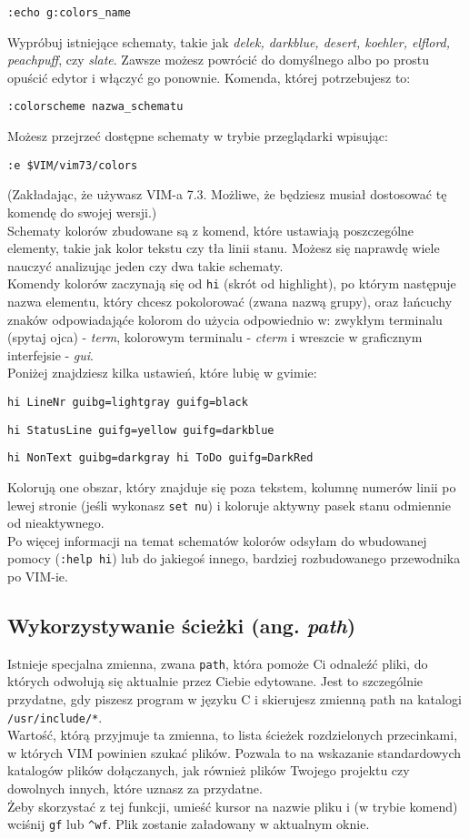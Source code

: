\documentclass[a4paper,12pt]{article}
\begin{document}
{\tt :echo g:colors\_name}

\noindent
Wypróbuj istniejące schematy, takie jak {\it delek, darkblue, desert, koehler, elflord, peachpuff}, czy {\it slate}. Zawsze możesz powrócić do domyślnego albo po prostu opuścić edytor i włączyć go ponownie. Komenda, której potrzebujesz to:

{\tt :colorscheme nazwa\_schematu}

\noindent
Możesz przejrzeć dostępne schematy w trybie przeglądarki wpisując:

{\tt :e \$VIM/vim73/colors}

\noindent
(Zakładając, że używasz VIM-a 7.3. Możliwe, że będziesz musiał dostosować tę komendę do swojej wersji.)\\
Schematy kolorów zbudowane są z komend, które ustawiają poszczególne elementy, takie jak kolor tekstu czy tła linii stanu. Możesz się naprawdę wiele nauczyć analizując jeden czy dwa takie schematy.\\
Komendy kolorów zaczynają się od {\tt hi} (skrót od highlight), po którym następuje nazwa elementu, który chcesz pokolorować (zwana nazwą grupy), oraz łańcuchy znaków odpowiadająće kolorom do użycia odpowiednio w: zwykłym terminalu (spytaj ojca) - {\it term}, kolorowym terminalu - {\it cterm} i wreszcie w graficznym interfejsie - {\it gui}.\\
Poniżej znajdziesz kilka ustawień, które lubię w gvimie:

{\tt hi LineNr guibg=lightgray guifg=black}

{\tt hi StatusLine guifg=yellow guifg=darkblue}

{\tt hi NonText guibg=darkgray hi ToDo guifg=DarkRed}

\noindent
Kolorują one obszar, który znajduje się poza tekstem, kolumnę numerów linii po lewej stronie (jeśli wykonasz {\tt set nu}) i koloruje aktywny pasek stanu odmiennie od nieaktywnego.\\
Po więcej informacji na temat schematów kolorów odsyłam do wbudowanej pomocy ({\tt :help hi}) lub do jakiegoś innego, bardziej rozbudowanego przewodnika po VIM-ie.
\subsection{Wykorzystywanie ścieżki (ang. {\it path})}
Istnieje specjalna zmienna, zwana {\tt path}, która pomoże Ci odnaleźć pliki, do których odwołują się aktualnie przez Ciebie edytowane. Jest to szczególnie przydatne, gdy piszesz program w języku C i skierujesz zmienną path na katalogi {\tt /usr/include/*}.\\
Wartość, którą przyjmuje ta zmienna, to lista ścieżek rozdzielonych przecinkami, w których VIM powinien szukać plików. Pozwala to na wskazanie standardowych katalogów plików dołączanych, jak również plików Twojego projektu czy dowolnych innych, które uznasz za przydatne.\\
Żeby skorzystać z tej funkcji, umieść kursor na nazwie pliku i (w trybie komend) wciśnij {\tt gf} lub {\tt\^{}wf}. Plik zostanie załadowany w aktualnym oknie.
\end{document}
